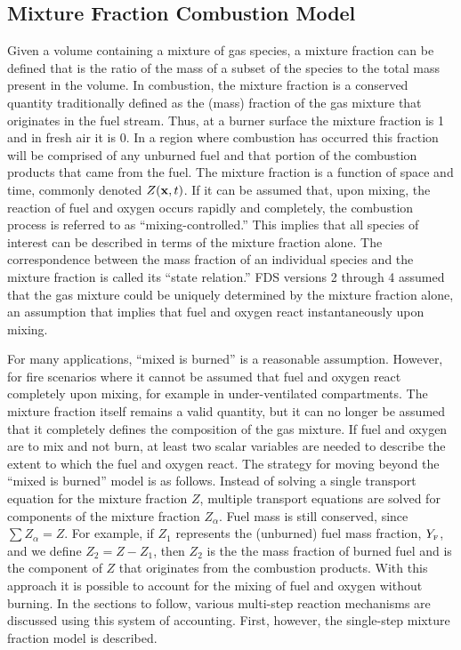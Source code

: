 \documentclass[11pt]{book}
\begin{document}
\subsection{Mixture Fraction Combustion Model}

Given a volume containing a mixture of gas species, a mixture fraction can be defined that
is the ratio of the mass of a subset of the species to the total mass present in the volume.
In combustion, the mixture fraction is a conserved quantity traditionally defined as the (mass) fraction of the
gas mixture that originates in
the fuel stream. Thus, at a burner surface the mixture fraction is 1 and in fresh air it is 0.
In a region where combustion has occurred this fraction will be comprised of any unburned fuel and
that portion of the combustion products that came from the fuel.
The mixture fraction is a function of space and time, commonly denoted $Z({\bf x},t)$.
If it can be assumed that, upon mixing, the reaction of fuel and oxygen occurs rapidly and completely,
the combustion process is referred to as ``mixing-controlled.'' This implies that all species of
interest can be described in terms of the mixture fraction alone.
The correspondence between the
mass fraction of an individual species and the mixture fraction is called its ``state relation.''
FDS versions 2 through 4 assumed that the gas mixture could be uniquely determined by the mixture fraction alone,
an assumption that implies that fuel and oxygen react instantaneously upon mixing.

For many applications, ``mixed is burned'' is a reasonable assumption. However, for fire scenarios where
it cannot be assumed that fuel and oxygen react completely upon mixing, for example in under-ventilated
compartments. The mixture fraction itself remains a valid quantity,
but it can no longer be assumed that it completely defines the composition of the gas mixture. If fuel and oxygen are to mix
and not burn, at least two scalar variables are needed to describe the extent to which the fuel and oxygen react.
The strategy for moving beyond the ``mixed is burned'' model is as follows. Instead of solving a single
transport equation for the mixture fraction $Z$, multiple transport equations are solved for components of the mixture
fraction $Z_\alpha$. Fuel mass is still conserved, since $\sum Z_\alpha=Z$. For example, if $Z_1$ represents
the (unburned) fuel mass fraction,
$Y_{\tiny \hbox{F}}$, and we define $Z_2 = Z-Z_1$, then $Z_2$ is the the mass fraction of burned fuel and is
the component of $Z$ that originates from the combustion products.
With this approach it is possible to account for the mixing of fuel and oxygen without burning. In the sections
to follow, various multi-step reaction mechanisms are discussed using this system of accounting. First, however, the
single-step mixture fraction model is described.
\end{document}
